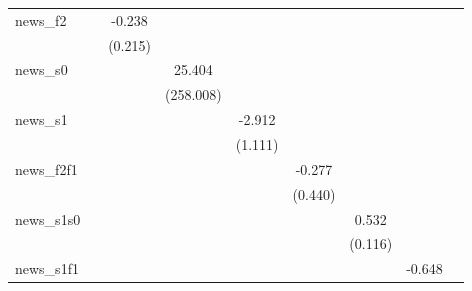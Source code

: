 {\begin{tabular}{l*{8}{c}}
\addlinespace
news\_f2     &                     &      -0.238         &                     &                     &                     &                     &                     &                     \\
            &                     &     (0.215)         &                     &                     &                     &                     &                     &                     \\
\addlinespace
news\_s0     &                     &                     &      25.404         &                     &                     &                     &                     &                     \\
            &                     &                     &   (258.008)         &                     &                     &                     &                     &                     \\
\addlinespace
news\_s1     &                     &                     &                     &      -2.912\sym{***}&                     &                     &                     &                     \\
            &                     &                     &                     &     (1.111)         &                     &                     &                     &                     \\
\addlinespace
news\_f2f1   &                     &                     &                     &                     &      -0.277         &                     &                     &                     \\
            &                     &                     &                     &                     &     (0.440)         &                     &                     &                     \\
\addlinespace
news\_s1s0   &                     &                     &                     &                     &                     &       0.532\sym{***}&                     &                     \\
            &                     &                     &                     &                     &                     &     (0.116)         &                     &                     \\
\addlinespace
news\_s1f1   &                     &                     &                     &                     &                     &                     &      -0.648         &                     \\

\end{tabular}}
